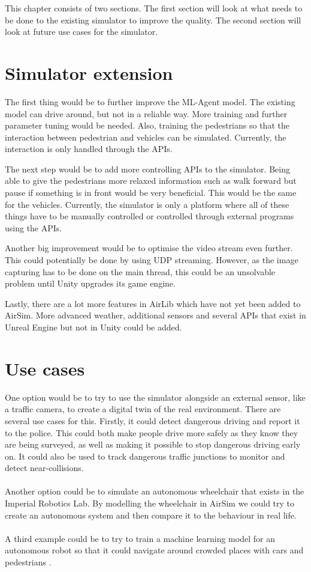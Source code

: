 This chapter consists of two sections. The first section will look at what needs to be done to the existing simulator to improve the quality. The second section will look at future use cases for the simulator.  

\section{Simulator extension}
The first thing would be to further improve the ML-Agent model. The existing model can drive around, but not in a reliable way. More training and further parameter tuning would be needed. Also, training the pedestrians so that the interaction between pedestrian and vehicles can be simulated. Currently, the interaction is only handled through the APIs.

The next step would be to add more controlling APIs to the simulator. Being able to give the pedestrians more relaxed information such as walk forward but pause if something is in front would be very beneficial. This would be the same for the vehicles. Currently, the simulator is only a platform where all of these things have to be manually controlled or controlled through external programs using the APIs.

Another big improvement would be to optimise the video stream even further. This could potentially be done by using UDP streaming. However, as the image capturing has to be done on the main thread, this could be an unsolvable problem until Unity upgrades its game engine. 

Lastly, there are a lot more features in AirLib which have not yet been added to AirSim. More advanced weather, additional sensors and several APIs that exist in Unreal Engine but not in Unity could be added. 


\section{Use cases}
One option would be to try to use the simulator alongside an external sensor, like a traffic camera, to create a digital twin of the real environment. There are several use cases for this. Firstly, it could detect dangerous driving and report it to the police. This could both make people drive more safely as they know they are being surveyed, as well as making it possible to stop dangerous driving early on. It could also be used to track dangerous traffic junctions to monitor and detect near-collisions. 
\\~\\
Another option could be to simulate an autonomous wheelchair that exists in the Imperial Robotics Lab. By modelling the wheelchair in AirSim we could try to create an autonomous system and then compare it to the behaviour in real life.
\\~\\
A third example could be to try to train a machine learning model for an autonomous robot so that it could navigate around crowded places with cars and pedestrians \cite{ChaoQianwen2015Vifm}. 
\\~\\